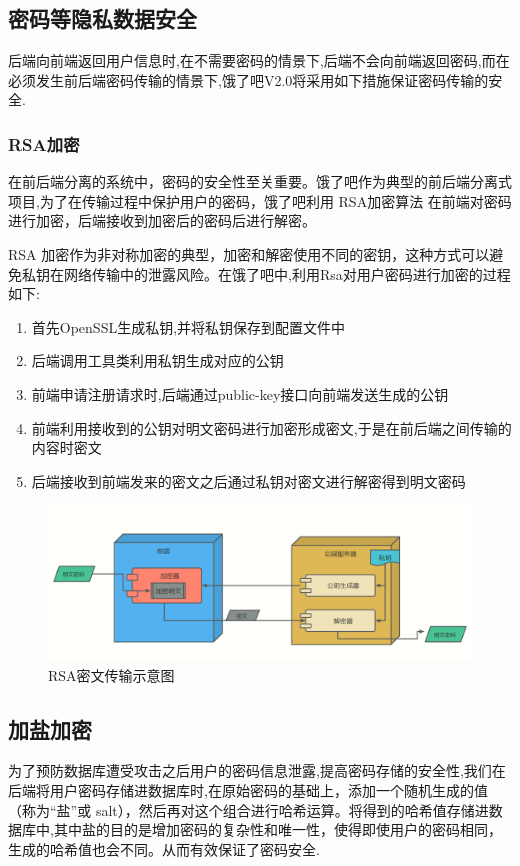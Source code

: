 \subsection{密码等隐私数据安全}
后端向前端返回用户信息时,在不需要密码的情景下,后端不会向前端返回密码,而在必须发生前后端密码传输的情景下,饿了吧V2.0将采用如下措施保证密码传输的安全.
\subsubsection{RSA加密}
在前后端分离的系统中，密码的安全性至关重要。饿了吧作为典型的前后端分离式项目,为了在传输过程中保护用户的密码，饿了吧利用 RSA加密算法 在前端对密码进行加密，后端接收到加密后的密码后进行解密。
    
RSA 加密作为非对称加密的典型，加密和解密使用不同的密钥，这种方式可以避免私钥在网络传输中的泄露风险。在饿了吧中,利用Rsa对用户密码进行加密的过程如下:

\begin{enumerate}
    \item 首先OpenSSL生成私钥,并将私钥保存到配置文件中
    \item 后端调用工具类利用私钥生成对应的公钥
    \item 前端申请注册请求时,后端通过public-key接口向前端发送生成的公钥
    \item 前端利用接收到的公钥对明文密码进行加密形成密文,于是在前后端之间传输的内容时密文
    \item 后端接收到前端发来的密文之后通过私钥对密文进行解密得到明文密码
\end{enumerate}
\begin{figure}[h]
    \centering
        \includegraphics[width=\linewidth]{pics/RSA加密流程.png}
    \caption{RSA密文传输示意图}
    \label{fig:rsa}
\end{figure}
\subsection{加盐加密}
为了预防数据库遭受攻击之后用户的密码信息泄露,提高密码存储的安全性,我们在后端将用户密码存储进数据库时,在原始密码的基础上，添加一个随机生成的值（称为“盐”或 salt），然后再对这个组合进行哈希运算。将得到的哈希值存储进数据库中,其中盐的目的是增加密码的复杂性和唯一性，使得即使用户的密码相同，生成的哈希值也会不同。从而有效保证了密码安全.

